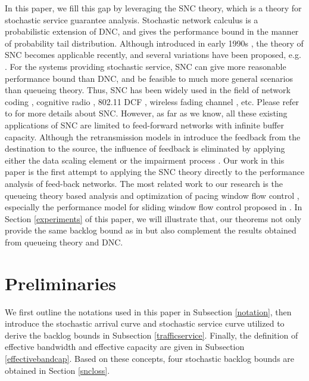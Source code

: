 \documentclass[paper]{ieice}
\begin{document}
In this paper, we fill this gap by leveraging the SNC theory, which is a theory for stochastic service guarantee analysis. Stochastic network calculus is a probabilistic extension of DNC, and gives the performance bound in the manner of probability tail distribution. Although introduced in early 1990s \cite{Chan94}, the theory of SNC becomes applicable recently, and several variations have been proposed, e.g. \cite{jiang2006basic,Fidl06,5984844,Ciucu2006Scaling}. For the systems providing stochastic service, SNC can give more reasonable performance bound than DNC, and be feasible to much more general scenarios than queueing theory. Thus, SNC has been widely used in the field of network coding \cite{10.1109/TPDS.2010.192}, cognitive radio \cite{5466711}, 802.11 DCF \cite{xie2010network}\cite{wang2012effectiveness}, wireless fading channel \cite{Fidler2006network,wangperformance}, etc. Please refer to \cite{JiangLiu-15877} for more details about SNC. However, as far as we know, all these existing applications of SNC are limited to feed-forward networks with infinite buffer capacity. Although the retransmission models in \cite{wangperformance,5466711} introduce the feedback from the destination to the source, the influence of feedback is eliminated by applying either the data scaling element \cite{wangperformance} or the impairment process \cite{5466711}. Our work in this paper is the first attempt to applying the SNC theory directly to the performance analysis of feed-back networks. The most related work to our research is the queueing theory based analysis and optimization of pacing window flow control \cite{jung1996analysis,1095377}, especially the performance model for sliding window flow control proposed in \cite{jung1996analysis}. In Section \ref{experiments} of this paper, we will illustrate that, our theorems not only provide the same backlog bound as in \cite{jung1996analysis} but also complement the results obtained from queueing theory and DNC.

\section{Preliminaries}\label{Notations}
We first outline the notations used in this paper in Subsection \ref{notation}, then introduce the stochastic arrival curve and stochastic service curve utilized to derive the backlog bounds in Subsection \ref{trafficservice}. Finally, the definition of effective bandwidth and effective capacity are given in Subsection \ref{effectivebandcap}. Based on these concepts, four stochastic backlog bounds are obtained in Section \ref{sncloss}.
\end{document}
